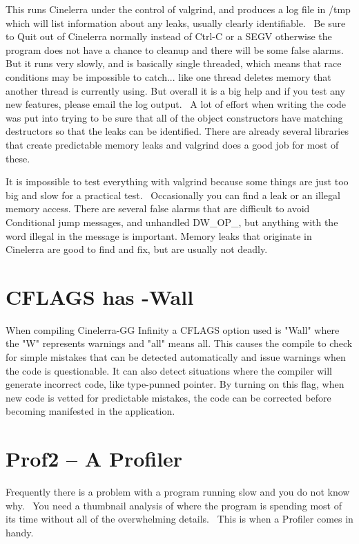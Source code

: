 This runs Cinelerra under the control of valgrind, and produces a log file in /tmp which will list information about any leaks, usually clearly identifiable. \ Be sure to Quit out of Cinelerra normally instead of Ctrl-C or a SEGV otherwise the program does not have a chance to cleanup and there will be some false alarms. But it runs very slowly, and is basically single threaded, which means that race conditions may be impossible to catch... like one thread deletes memory that another thread is currently using. But overall it is a big help and if you test any new features, please email the log output. \ A lot of effort when writing the code was put into trying to be sure that all of the object constructors have matching destructors so that the leaks can be identified. There are already several libraries that create predictable memory leaks and valgrind does a good job for most of these.
\medskip

It is impossible to test everything with valgrind because some things are just too big and slow for a practical test. \ Occasionally you can find a leak or an illegal memory access. There are several false alarms that are difficult to avoid {\textquotedbl}Conditional jump{\textquotedbl} messages, and {\textquotedbl}unhandled DW\_OP\_{\textquotedbl}, but anything with the word {\textquotedbl}illegal{\textquotedbl} in the message is important. Memory leaks that originate in Cinelerra are good to find and fix, but are usually not deadly.

\section{CFLAGS has -Wall}
\label{sec:CFLAGS has -Wall}
When compiling Cinelerra-GG Infinity a CFLAGS option used is "Wall" where the "W" represents warnings and "all" means all.  This causes the compile to check for simple mistakes that can be detected automatically and issue warnings when the code is questionable.  It can also detect situations where the compiler will generate incorrect code, like type-punned pointer.  By turning on this flag, when new code is vetted for predictable mistakes, the code can be corrected before becoming manifested in the application.

\section{Prof2 -- A Profiler}
\label{sec:Prof2 -- A Profiler}

Frequently there is a problem with a program running slow and you do not know why. \ You need a thumbnail analysis of where the program is spending most of its time without all of the overwhelming details. \ This is when a Profiler comes in handy.
\medskip

